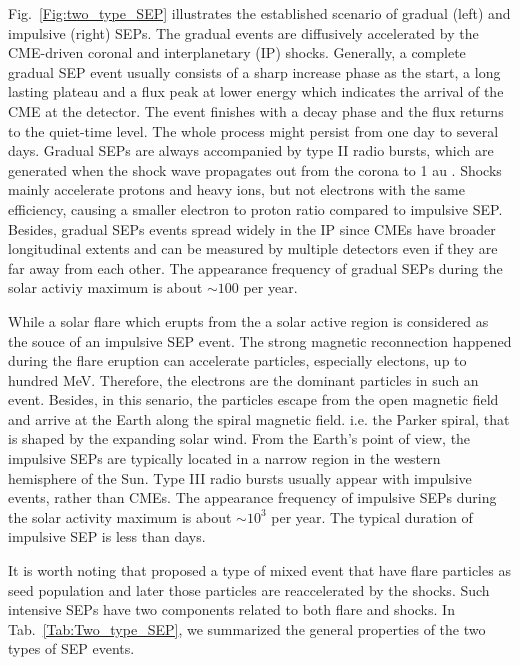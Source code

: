 Fig.~\ref{Fig:two_type_SEP} illustrates the established scenario of gradual (left) and impulsive (right) \acp{SEP}.
The gradual events are diffusively accelerated by the \ac{CME}-driven coronal and interplanetary (IP) shocks. Generally, a complete gradual \ac{SEP} event usually consists of a sharp increase phase as the start, a long lasting plateau and a flux peak at lower energy which indicates the arrival of the \ac{CME} at the detector. The event finishes with a decay phase and the flux returns to the quiet-time level. The whole process might persist from one day to several days. Gradual \acp{SEP} are always accompanied by type II radio bursts, which are generated when the shock wave propagates out from the corona to 1 au \citep{Gopalswamy2006GMS}.
Shocks mainly accelerate protons and heavy ions, but not electrons with the same efficiency, causing a smaller electron to proton ratio compared to impulsive \ac{SEP}. Besides, gradual \acp{SEP} events spread widely in the IP since \acp{CME} have broader longitudinal extents and can be measured by multiple detectors even if they are far away from each other. 
The appearance frequency of gradual \acp{SEP} during the solar activiy maximum is about $\sim 100$ per year.

While a solar flare which erupts from the a solar active region is considered as the souce of an impulsive \ac{SEP} event. The strong magnetic reconnection happened during the flare eruption can accelerate particles, especially electons, up to hundred MeV. Therefore, the electrons are the dominant particles in such an event. Besides, in this senario, the particles escape from the open magnetic field and arrive at the Earth along the spiral magnetic field. i.e. the Parker spiral, \citep{Parker-1958} that is shaped by the expanding solar wind. From the Earth's point of view, the impulsive \acp{SEP} are typically located in a narrow region in the western hemisphere of the Sun. Type III radio bursts usually appear with impulsive events, rather than \acp{CME}.
The appearance frequency of impulsive \acp{SEP} during the solar activity maximum is about $\sim 10^3$ per year. The typical duration of impulsive \ac{SEP} is less than days.

It is worth noting that \citep{cane2003two} proposed a type of mixed event that have flare particles as seed population and later those particles are reaccelerated by the shocks. Such intensive \acp{SEP} have two components related to both flare and shocks.  %
In Tab.~\ref{Tab:Two_type_SEP}, we summarized the general properties of the two types of \ac{SEP} events.

